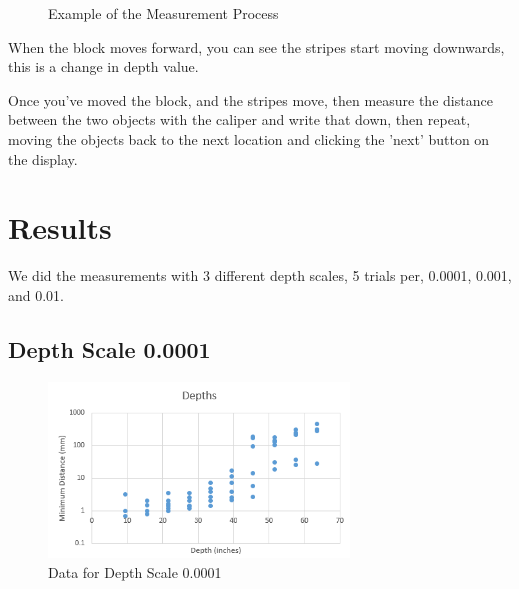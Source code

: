 \documentclass{article}
\begin{document}
					\begin{figure}[h]
						\centering
						\caption{Example of the Measurement Process}
						\label{fig:examplemeasvideo}
					\end{figure}
				
					When the block moves forward, you can see the stripes start moving downwards, this is a change in depth value.
					
					Once you've moved the block, and the stripes move, then measure the distance between the two objects with the caliper and write that down, then repeat, moving the objects back to the next location and clicking the 'next' button on the display.
					
				\newpage
				\section{Results}
					We did the measurements with 3 different depth scales, 5 trials per, 0.0001, 0.001, and 0.01.
					
					\subsection{Depth Scale 0.0001}
						\begin{figure}[h]
							\includegraphics[width=8cm]{./images/DS_0001.png}
							\centering
							\caption{Data for Depth Scale 0.0001}
							\label{fig:ds0.0001}
						\end{figure}
					
\end{document}
